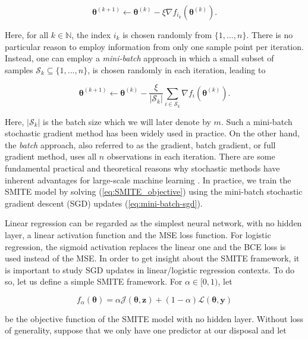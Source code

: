 \documentclass{article}
\def\z{\mathbf z}
\def\y{\mathbf y}
\begin{document}
\begin{equation}
    \boldsymbol{\theta}^{(k+1)} \leftarrow \boldsymbol{\theta}^{(k)} - \xi \nabla f_{i_k} (\boldsymbol{\theta}^{(k)}).
\end{equation}

Here, for all $k \in \mathbb{N}$, the index $i_k$ is chosen randomly from $\{1,...,n\}$. There is no particular reason to employ information from only one sample point per iteration. Instead, one can employ a {\it mini-batch} approach in which a small subset of samples $\mathcal{S}_k \subseteq \{1, ..., n\}$, is chosen randomly in each iteration, leading to

\begin{equation}
    \boldsymbol{\theta}^{(k+1)} \leftarrow \boldsymbol{\theta}^{(k)} - \frac{\xi}{|\mathcal{S}_k|} \sum_{i \in \mathcal{S}_k} \nabla f_{i} (\boldsymbol{\theta}^{(k)}).
    \label{eq:mini-batch-sgd}
\end{equation}

Here, $|\mathcal{S}_k|$ is the batch size which we will later denote by $m$. Such a mini-batch stochastic gradient method has been widely used in practice. On the other hand, the {\it batch} approach, also referred to as the gradient, batch gradient, or full gradient method, uses all $n$ observations in each iteration. There are some fundamental practical and theoretical reasons why stochastic methods have inherent advantages for large-scale machine learning \citep{bottou2018optimization}. In practice, we train the SMITE model by solving (\ref{eq:SMITE_objective}) using the mini-batch stochastic gradient descent (SGD) updates (\ref{eq:mini-batch-sgd}). 

Linear regression can be regarded as the simplest neural network, with no hidden layer, a linear activation function and the MSE loss function. For logistic regression, the sigmoid activation replaces the linear one and the BCE loss is used instead of the MSE. In order to get insight about the SMITE framework, it is important to study SGD updates in linear/logistic regression contexts. To do so, let us define a simple SMITE framework. For $\alpha \in [0,1)$, let 

\begin{equation}
    f_{\alpha}(\boldsymbol{\theta}) = \alpha \mathcal{J}(\boldsymbol{\theta}, \z)+ (1 - \alpha)  \mathcal{L}(\boldsymbol{\theta}, \y)
    \label{eq:obj_simple}
\end{equation}

be the objective function of the SMITE model with no hidden layer. Without loss of generality, suppose that we only have one predictor at our disposal and let
\end{document}
